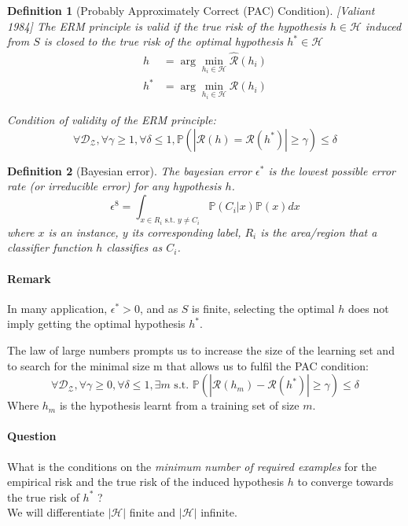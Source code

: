 \documentclass{article}
\newtheorem{defi}{Definition}
\begin{document}
\begin{defi}[Probably Approximately Correct (PAC) Condition][Valiant 1984]
The ERM principle is valid if the true risk of the hypothesis $h \in \mathcal{H}$ induced from $S$ is closed to the true risk of the optimal hypothesis $h^* \in \mathcal{H}$
\begin{align*}
h &= \arg \min_{h_i \in \mathcal{H}} \hat{\mathcal{R}}(h_i)\\
h^* &= \arg \min_{h_i\in \mathcal{H}} \mathcal{R}(h_i)
\end{align*}

Condition of validity of the ERM principle:
\[\forall \mathcal{D}_\mathcal{Z}, \forall \gamma \geq 1, \forall \delta \leq 1, \mathbb{P}(|\mathcal{R}(h)=\mathcal{R}(h^*)|\geq \gamma) \leq \delta\]
\end{defi}

\begin{defi}[Bayesian error]
\label{def:BayErr}
The bayesian error $\epsilon^*$ is the lowest possible error rate (or irreducible error) for any hypothesis $h$.
\[\epsilon^8 = \int_{x\in R_i \text{ s.t. }y\neq C_i} \mathbb{P}(C_i|x)\mathbb{P}(x)dx\]
where $x$ is an instance, $y$ its corresponding label, $R_i$ is the area/region that a classifier function $h$ classifies as $C_i$.
\end{defi}


\paragraph{Remark}
In many application, $\epsilon^* >0$, and as $S$ is finite, selecting the optimal $h$ does not imply getting the optimal hypothesis $h^*$.
\bigskip


The law of large numbers prompts us to increase the size of the learning set and to search for the minimal size m that allows us to fulfil the PAC
condition:
\[\forall \mathcal{D}_{\mathcal{Z}}, \forall \gamma \geq 0, \forall \delta \leq 1, \exists m \text{ s.t. } \mathbb{P}(|\mathcal{R}(h_m)-\mathcal{R}(h^*)|\geq \gamma) \leq \delta\]
Where $h_m$ is the hypothesis learnt from a training set of size $m$.


\paragraph{Question} What is the conditions on the \emph{minimum number of required examples} for the empirical risk and the true risk of the induced hypothesis $h$ to converge towards the true risk of $h^*$ ?\\
We will differentiate $|\mathcal{H}|$ finite and $|\mathcal{H}|$ infinite. 
\end{document}
